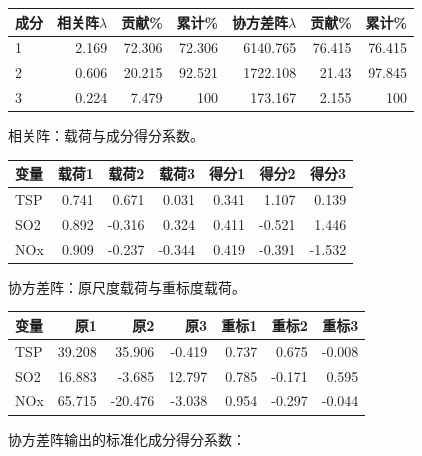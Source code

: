 \begin{center}\small\setlength{\tabcolsep}{4pt}\renewcommand{\arraystretch}{1.18}\begin{tabular}{@{}lrrrrrr@{}}
\toprule
成分 & 相关阵\(\lambda\) & 贡献\% & 累计\% & 协方差阵\(\lambda\) & 贡献\% & 累计\% \\
\midrule

1 & 2.169 & 72.306 & 72.306 & 6140.765 & 76.415 & 76.415 \\
2 & 0.606 & 20.215 & 92.521 & 1722.108 & 21.43 & 97.845 \\
3 & 0.224 & 7.479 & 100 & 173.167 & 2.155 & 100 \\
\bottomrule\end{tabular}\end{center}

相关阵：载荷与成分得分系数。

\begin{center}\small\setlength{\tabcolsep}{4pt}\renewcommand{\arraystretch}{1.18}\begin{tabular}{@{}lrrrrrr@{}}
\toprule
变量 & 载荷1 & 载荷2 & 载荷3 & 得分1 & 得分2 & 得分3 \\
\midrule

TSP & 0.741 & 0.671 & 0.031 & 0.341 & 1.107 & 0.139 \\
SO2 & 0.892 & -0.316 & 0.324 & 0.411 & -0.521 & 1.446 \\
NOx & 0.909 & -0.237 & -0.344 & 0.419 & -0.391 & -1.532 \\
\bottomrule\end{tabular}\end{center}

协方差阵：原尺度载荷与重标度载荷。

\begin{center}\small\setlength{\tabcolsep}{4pt}\renewcommand{\arraystretch}{1.18}\begin{tabular}{@{}lrrrrrr@{}}
\toprule
变量 & 原1 & 原2 & 原3 & 重标1 & 重标2 & 重标3 \\
\midrule

TSP & 39.208 & 35.906 & -0.419 & 0.737 & 0.675 & -0.008 \\
SO2 & 16.883 & -3.685 & 12.797 & 0.785 & -0.171 & 0.595 \\
NOx & 65.715 & -20.476 & -3.038 & 0.954 & -0.297 & -0.044 \\
\bottomrule\end{tabular}\end{center}

协方差阵输出的标准化成分得分系数：

